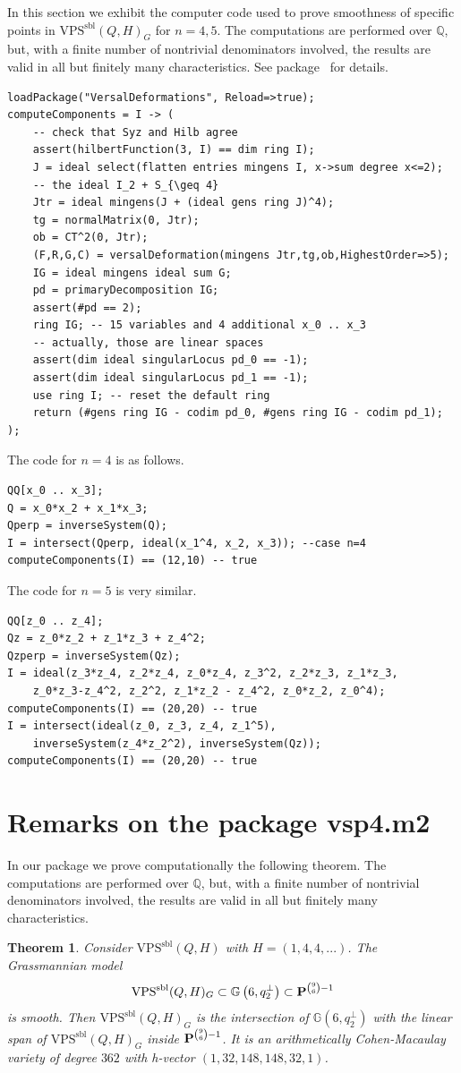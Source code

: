 \documentclass{amsart}
\newcommand{\QQ}{{\mathbb Q}}
\newcommand{\PP}{{\bf P}}
\def\Gr #1#2{{\mathbb G}\left(#1,#2\right)} %
\newcommand{\VPSsbl}{{\mathrm{VPS}}^{\mathrm{sbl}}(Q, H)}
\newtheorem{theorem}[lemma]{\bf Theorem}
\begin{document}
In this section we exhibit the computer code used to prove smoothness of
specific points in $\VPSsbl_G$ for $n=4,5$. The computations are performed
over $\QQ$, but, with a finite number of nontrivial denominators involved, the
results are valid in all but finitely many characteristics. See
package~\cite{Ilten} for details.
\begin{verbatim}
loadPackage("VersalDeformations", Reload=>true);
computeComponents = I -> (
    -- check that Syz and Hilb agree
    assert(hilbertFunction(3, I) == dim ring I);
    J = ideal select(flatten entries mingens I, x->sum degree x<=2);
    -- the ideal I_2 + S_{\geq 4}
    Jtr = ideal mingens(J + (ideal gens ring J)^4);
    tg = normalMatrix(0, Jtr);
    ob = CT^2(0, Jtr);
    (F,R,G,C) = versalDeformation(mingens Jtr,tg,ob,HighestOrder=>5);
    IG = ideal mingens ideal sum G;
    pd = primaryDecomposition IG;
    assert(#pd == 2);
    ring IG; -- 15 variables and 4 additional x_0 .. x_3
    -- actually, those are linear spaces
    assert(dim ideal singularLocus pd_0 == -1);
    assert(dim ideal singularLocus pd_1 == -1);
    use ring I; -- reset the default ring
    return (#gens ring IG - codim pd_0, #gens ring IG - codim pd_1);
);
\end{verbatim}
The code for $n=4$ is as follows.
\begin{verbatim}
QQ[x_0 .. x_3];
Q = x_0*x_2 + x_1*x_3;
Qperp = inverseSystem(Q);
I = intersect(Qperp, ideal(x_1^4, x_2, x_3)); --case n=4
computeComponents(I) == (12,10) -- true
\end{verbatim}
The code for $n=5$ is very similar.
\begin{verbatim}
QQ[z_0 .. z_4];
Qz = z_0*z_2 + z_1*z_3 + z_4^2;
Qzperp = inverseSystem(Qz);
I = ideal(z_3*z_4, z_2*z_4, z_0*z_4, z_3^2, z_2*z_3, z_1*z_3,
    z_0*z_3-z_4^2, z_2^2, z_1*z_2 - z_4^2, z_0*z_2, z_0^4);
computeComponents(I) == (20,20) -- true
I = intersect(ideal(z_0, z_3, z_4, z_1^5),
    inverseSystem(z_4*z_2^2), inverseSystem(Qz));
computeComponents(I) == (20,20) -- true
\end{verbatim}

\section{Remarks on the package vsp4.m2}\label{vsp4package}

In our package we prove computationally the following theorem.
The computations are performed over $\QQ$, but, with a finite number of nontrivial denominators involved, the results are valid in all but finitely many characteristics.
 \begin{theorem}\label{appendix:B1} Consider $\VPSsbl$ with $H=(1,4,4,...)$. The Grassmannian model  
 $$\VPSsbl_G \subset \Gr{6}{q^{\perp}_2} \subset \PP^{\binom{9}{6}-1}$$
 is smooth. Then $\VPSsbl_G$ is the intersection of $\Gr{6}{q^{\perp}_2}$ with the linear span of
 $\VPSsbl_G$ inside  $\PP^{\binom{9}{6}-1}$.
 It is an arithmetically Cohen-Macaulay variety of degree $362$ with h-vector
 $(1,32,148,148,32,1)$.
 \end{theorem}
\end{document}
